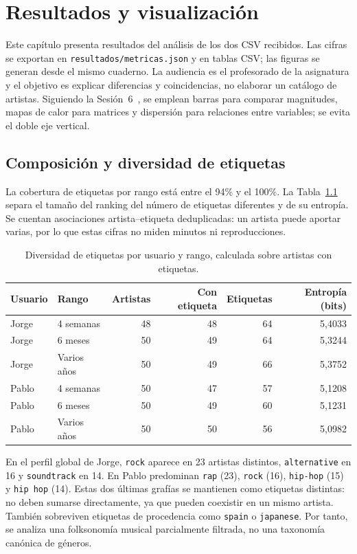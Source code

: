 \chapter{Resultados y visualización}
\label{chap:resultados}

Este capítulo presenta resultados del análisis de los dos CSV recibidos. Las cifras se exportan en \texttt{resultados/metricas.json} y en tablas CSV; las figuras se generan desde el mismo cuaderno. La audiencia es el profesorado de la asignatura y el objetivo es explicar diferencias y coincidencias, no elaborar un catálogo de artistas. Siguiendo la Sesión~6~\cite{sesion6}, se emplean barras para comparar magnitudes, mapas de calor para matrices y dispersión para relaciones entre variables; se evita el doble eje vertical.

\section{Composición y diversidad de etiquetas}

La cobertura de etiquetas por rango está entre el 94\% y el 100\%. La Tabla~\ref{tab:diversidad} separa el tamaño del ranking del número de etiquetas diferentes y de su entropía. Se cuentan asociaciones artista--etiqueta deduplicadas: un artista puede aportar varias, por lo que estas cifras no miden minutos ni reproducciones.

\begin{table}[H]
\centering
\small
\begin{tabular}{llrrrr}
\hline
Usuario & Rango & Artistas & Con etiqueta & Etiquetas & Entropía (bits) \\
\hline
Jorge & 4 semanas & 48 & 48 & 64 & 5,4033 \\
Jorge & 6 meses & 50 & 49 & 64 & 5,3244 \\
Jorge & Varios años & 50 & 49 & 66 & 5,3752 \\
Pablo & 4 semanas & 50 & 47 & 57 & 5,1208 \\
Pablo & 6 meses & 50 & 49 & 60 & 5,1231 \\
Pablo & Varios años & 50 & 50 & 56 & 5,0982 \\
\hline
\end{tabular}
\caption{Diversidad de etiquetas por usuario y rango, calculada sobre artistas con etiquetas.}
\label{tab:diversidad}
\end{table}

En el perfil global de Jorge, \texttt{rock} aparece en 23 artistas distintos, \texttt{alternative} en 16 y \texttt{soundtrack} en 14. En Pablo predominan \texttt{rap} (23), \texttt{rock} (16), \texttt{hip-hop} (15) y \texttt{hip hop} (14). Estas dos últimas grafías se mantienen como etiquetas distintas: no deben sumarse directamente, ya que pueden coexistir en un mismo artista. También sobreviven etiquetas de procedencia como \texttt{spain} o \texttt{japanese}. Por tanto, se analiza una folksonomía musical parcialmente filtrada, no una taxonomía canónica de géneros.

